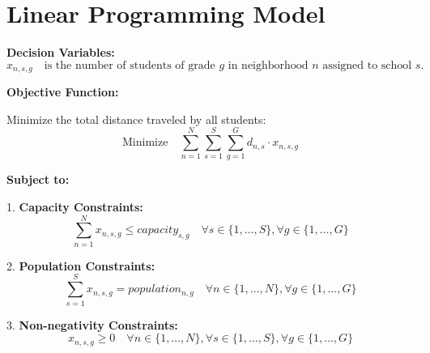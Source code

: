 \documentclass{article}
\begin{document}
\section*{Linear Programming Model}

\textbf{Decision Variables:}
\[
x_{n,s,g} \quad \text{is the number of students of grade } g \text{ in neighborhood } n \text{ assigned to school } s.
\]

\textbf{Objective Function:}

Minimize the total distance traveled by all students:
\[
\text{Minimize} \quad \sum_{n=1}^{N} \sum_{s=1}^{S} \sum_{g=1}^{G} d_{n,s} \cdot x_{n,s,g}
\]

\textbf{Subject to:}

1. \textbf{Capacity Constraints:}
\[
\sum_{n=1}^{N} x_{n,s,g} \leq capacity_{s,g} \quad \forall s \in \{1, \ldots, S\}, \forall g \in \{1, \ldots, G\}
\]

2. \textbf{Population Constraints:}
\[
\sum_{s=1}^{S} x_{n,s,g} = population_{n,g} \quad \forall n \in \{1, \ldots, N\}, \forall g \in \{1, \ldots, G\}
\]

3. \textbf{Non-negativity Constraints:}
\[
x_{n,s,g} \geq 0 \quad \forall n \in \{1, \ldots, N\}, \forall s \in \{1, \ldots, S\}, \forall g \in \{1, \ldots, G\}
\]
\end{document}
